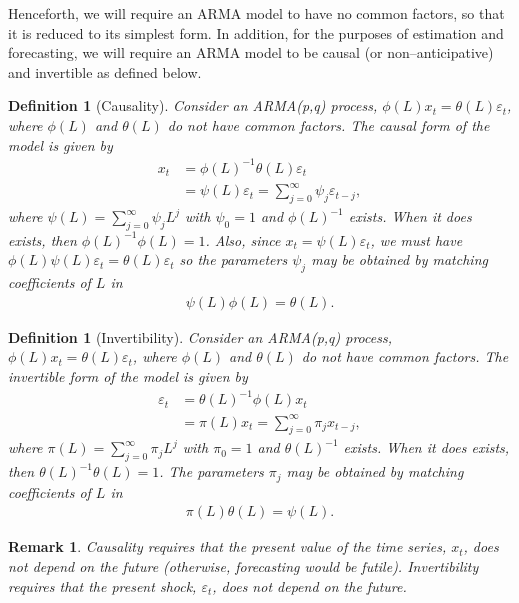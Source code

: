 \documentclass[
paper=128mm:96mm, %
fontsize=9.5pt, %
pagesize, %
parskip=half-, %
]{scrartcl} %
\theoremstyle{mythmstyle} %
\newtheorem{remark}[theorem]{Remark} %
\newtheorem{definition}[theorem]{Definition} %
\begin{document}
Henceforth, we will require an ARMA model to have no common factors, so that it is reduced to its simplest form. In addition, for the purposes of estimation and forecasting, we will require an ARMA model to be causal (or non--anticipative) and invertible as defined below.

\begin{definition}[Causality]
Consider an ARMA(p,q) process, $\phi(L)x_t=\theta(L)\varepsilon_t$, where $\phi(L)$ and $\theta(L)$ do not have common factors. The causal form of the model is given by
%
\begin{align}
x_t&=\phi(L)^{-1}\theta(L)\varepsilon_t\nonumber\\
&=\psi(L)\varepsilon_t=\sum_{j=0}^\infty\psi_j\varepsilon_{t-j},
\label{eq:wold_causality_AR}
\end{align}
%
where $\psi(L)=\sum_{j=0}^\infty\psi_jL^j$ with $\psi_0=1$ and $\phi(L)^{-1}$ exists. When it does exists, then $\phi(L)^{-1}\phi(L)=1$. Also, since $x_t=\psi(L)\varepsilon_t$, we must have $\phi(L)\psi(L)\varepsilon_t=\theta(L)\varepsilon_t$ so the parameters $\psi_j$ may be obtained by matching coefficients of $L$ in 
%
\begin{align}
\psi(L)\phi(L)=\theta(L).
\end{align}
%
\end{definition}

\clearpage

\begin{definition}[Invertibility]
Consider an ARMA(p,q) process, $\phi(L)x_t=\theta(L)\varepsilon_t$, where $\phi(L)$ and $\theta(L)$ do not have common factors. The invertible form of the model is given by
%
\begin{align}
\varepsilon_t&=\theta(L)^{-1}\phi(L)x_t\nonumber\\
&=\pi(L)x_t=\sum_{j=0}^\infty\pi_j x_{t-j},
\label{eq:wold_causality_MA}
\end{align}
%
where $\pi(L)=\sum_{j=0}^\infty\pi_jL^j$ with $\pi_0=1$ and $\theta(L)^{-1}$ exists. When it does exists, then $\theta(L)^{-1}\theta(L)=1$. The parameters $\pi_j$ may be obtained by matching coefficients of $L$ in 
%
\begin{align}
\pi(L)\theta(L)=\psi(L).\nonumber
\end{align}
%
\end{definition}


\begin{remark}
Causality requires that the present value of the time series, $x_t$, does not depend on the future (otherwise, forecasting would be futile). Invertibility requires that the present shock, $\varepsilon_t$, does not depend on the future.
\end{remark}
\end{document}
